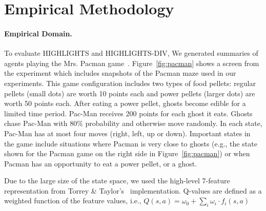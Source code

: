 \section{Empirical Methodology}
\label{sec:empirical}
\paragraph{Empirical Domain.} To evaluate HIGHLIGHTS and HIGHLIGHTS-DIV, We generated summaries of agents playing the Mrs. Pacman game~\cite{rohlfshagen2011ms}. Figure~\ref{fig:pacman} shows a screen from the experiment which includes snapshots of the Pacman maze used in our experiments. This game configuration includes two types of food pellets: regular pellets (small dots) are worth 10 points each and power pellets (larger dots) are worth 50 points each. After eating a power pellet, ghosts become edible for a limited time period. Pac-Man receives 200 points for each ghost it eats. Ghosts chase Pac-Man with $80\%$ probability and otherwise move randomly. In each state, Pac-Man has at most four moves (right, left, up or down). Important states in the game include situations where Pacman is very close to ghosts (e.g., the state shown for the Pacman game on the right side in Figure~\ref{fig:pacman}) or  when Pacman has an opportunity to eat a power pellet, or a ghost. 

Due to the large size of the state space, we used the high-level 7-feature representation from Torrey \& Taylor's~ implementation. Q-values are defined as a weighted function of the feature values, i.e., $Q(s,a)=\omega_{0}+\sum_{i}{\omega_{i} \cdot f_{i}(s,a)}$


